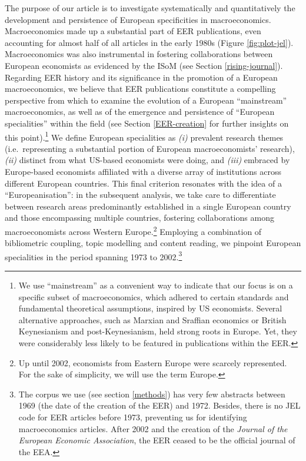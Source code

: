 \documentclass[
  12pt,
  onecolumn]{article}
\begin{document}
The purpose of our article is to investigate systematically and quantitatively the development and persistence of European specificities in macroeconomics. Macroeconomics made up a substantial part of EER publications, even accounting for almost half of all articles in the early 1980s (Figure \ref{fig:plot-jel}). Macroeconomics was also instrumental in fostering collaborations between European economists as evidenced by the ISoM (see Section \ref{rising-journal}). Regarding EER history and its significance in the promotion of a European macroeconomics, we believe that EER publications constitute a compelling perspective from which to examine the evolution of a European ``mainstream'' macroeconomics, as well as of the emergence and persistence of ``European specialities'' within the field (see Section \ref{EER-creation} for further insights on this point).\footnote{We use ``mainstream'' as a convenient way to indicate that our focus is on a specific subset of macroeconomics, which adhered to certain standards and fundamental theoretical assumptions, inspired by US economists. Several alternative approaches, such as Marxian and Sraffian economics or British Keynesianism and post-Keynesianism, held strong roots in Europe. Yet, they were considerably less likely to be featured in publications within the EER.} We define European specialities as \emph{(i)} prevalent research themes (i.e.~representing a substantial portion of European macroeconomists' research), \emph{(ii)} distinct from what US-based economists were doing, and \emph{(iii)} embraced by Europe-based economists affiliated with a diverse array of institutions across different European countries. This final criterion resonates with the idea of a ``Europeanisation'': in the subsequent analysis, we take care to differentiate between research areas predominantly established in a single European country and those encompassing multiple countries, fostering collaborations among macroeconomists across Western Europe.\footnote{Up until 2002, economists from Eastern Europe were scarcely represented. For the sake of simplicity, we will use the term Europe.} Employing a combination of bibliometric coupling, topic modelling and content reading, we pinpoint European specialities in the period spanning 1973 to 2002.\footnote{The corpus we use (see section \ref{methods}) has very few abstracts between 1969 (the date of the creation of the EER) and 1972. Besides, there is no JEL code for EER articles before 1973, preventing us for identifying macroeconomics articles. After 2002 and the creation of the \emph{Journal of the European Economic Association}, the EER ceased to be the official journal of the EEA.}
\end{document}
